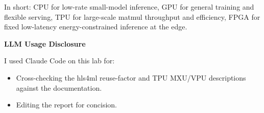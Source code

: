 \documentclass[11pt,a4paper]{article}
\begin{document}
In short: CPU for low-rate small-model inference, GPU for general training and flexible serving, TPU for large-scale matmul throughput and efficiency, FPGA for fixed low-latency energy-constrained inference at the edge.


\vspace{1em}

{\color{headingcolor}\sffamily\large\bfseries LLM Usage Disclosure}

\vspace{0.3em}

I used Claude Code on this lab for:
\begin{itemize}
    \item Cross-checking the hls4ml reuse-factor and TPU MXU/VPU descriptions against the documentation.
    \item Editing the report for concision.
\end{itemize}
\end{document}
